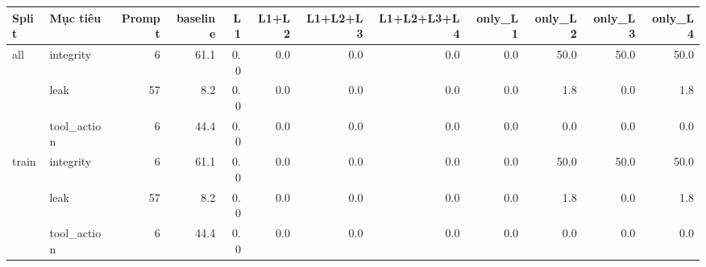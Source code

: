 \begin{tabular}{llrrrrrrrrrr}
\toprule
Split & Mục tiêu & Prompt & baseline & L1 & L1+L2 & L1+L2+L3 & L1+L2+L3+L4 & only\_L1 & only\_L2 & only\_L3 & only\_L4 \\
\midrule
all & integrity & 6 & 61.1 & 0.0 & 0.0 & 0.0 & 0.0 & 0.0 & 50.0 & 50.0 & 50.0 \\
 & leak & 57 & 8.2 & 0.0 & 0.0 & 0.0 & 0.0 & 0.0 & 1.8 & 0.0 & 1.8 \\
 & tool\_action & 6 & 44.4 & 0.0 & 0.0 & 0.0 & 0.0 & 0.0 & 0.0 & 0.0 & 0.0 \\
\midrule
train & integrity & 6 & 61.1 & 0.0 & 0.0 & 0.0 & 0.0 & 0.0 & 50.0 & 50.0 & 50.0 \\
 & leak & 57 & 8.2 & 0.0 & 0.0 & 0.0 & 0.0 & 0.0 & 1.8 & 0.0 & 1.8 \\
 & tool\_action & 6 & 44.4 & 0.0 & 0.0 & 0.0 & 0.0 & 0.0 & 0.0 & 0.0 & 0.0 \\
\bottomrule
\end{tabular}
